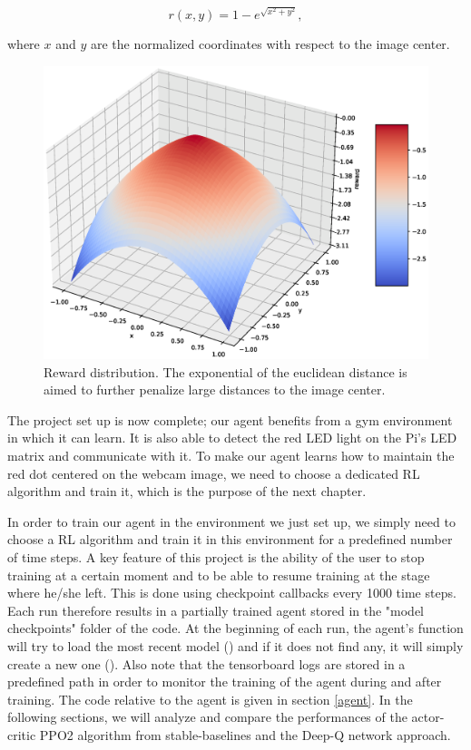 \begin{equation}
	r(x,y) = 1 - e^{\sqrt{x^2 + y^2}},
	\label{gaussian_reward}
\end{equation}

where $x$ and $y$ are the normalized coordinates with respect to the image center.

\begin{figure}[H]
	\centering
	\includegraphics[scale=0.35]{Images/reward.eps}
	\caption{Reward distribution. The exponential of the euclidean distance is aimed to further penalize large distances to the image center.}
	\label{reward_dist}
\end{figure}

The project set up is now complete; our agent benefits from a gym environment in which it can learn. It is also able to detect the red LED light on the Pi's LED matrix and communicate with it. To make our agent learns how to maintain the red dot centered on the webcam image, we need to choose a dedicated RL algorithm and train it, which is the purpose of the next chapter.


In order to train our agent in the environment we just set up, we simply need to choose a RL algorithm and train it in this environment for a predefined number of time steps. A key feature of this project is the ability of the user to stop training at a certain moment and to be able to resume training at the stage where he/she left. This is done using checkpoint callbacks every 1000 time steps. Each run therefore results in a partially trained agent stored in the "model checkpoints" folder of the code. At the beginning of each run, the agent's \texttt{} function will try to load the most recent model (\texttt{}) and if it does not find any, it will simply create a new one (\texttt{}). Also note that the tensorboard logs are stored in a predefined path in order to monitor the training of the agent during and after training.  The code relative to the agent is given in section \ref{agent}. In the following sections, we will analyze and compare the performances of the actor-critic PPO2 algorithm from stable-baselines and the Deep-Q network approach.

